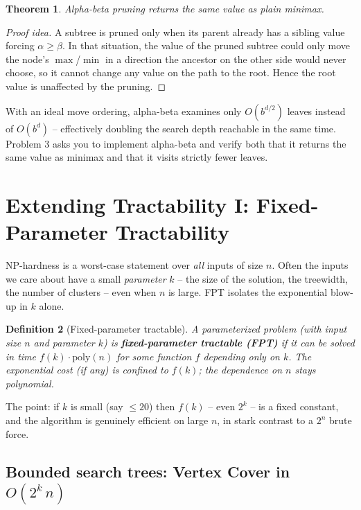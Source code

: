 \documentclass[11pt]{article}
\newtheorem{theorem}{Theorem}[section]
\newtheorem{definition}[theorem]{Definition}
\begin{document}
\begin{theorem}
Alpha-beta pruning returns the same value as plain minimax.
\end{theorem}

\begin{proof}[Proof idea]
A subtree is pruned only when its parent already has a sibling value forcing
$\alpha \ge \beta$. In that situation, the value of the pruned subtree could
only move the node's $\max$/$\min$ in a direction the ancestor on the other side
would never choose, so it cannot change any value on the path to the root.
Hence the root value is unaffected by the pruning.
\end{proof}

With an ideal move ordering, alpha-beta examines only $O(b^{d/2})$ leaves
instead of $O(b^d)$ -- effectively doubling the search depth reachable in the
same time. Problem 3 asks you to implement alpha-beta and verify both that it
returns the same value as minimax and that it visits strictly fewer leaves.

\section{Extending Tractability I: Fixed-Parameter Tractability}

NP-hardness is a worst-case statement over \emph{all} inputs of size $n$. Often
the inputs we care about have a small \emph{parameter} $k$ -- the size of the
solution, the treewidth, the number of clusters -- even when $n$ is large. FPT
isolates the exponential blow-up in $k$ alone.

\begin{definition}[Fixed-parameter tractable]
A parameterized problem (with input size $n$ and parameter $k$) is
\textbf{fixed-parameter tractable (FPT)} if it can be solved in time
$f(k)\cdot \mathrm{poly}(n)$ for some function $f$ depending only on $k$. The
exponential cost (if any) is confined to $f(k)$; the dependence on $n$ stays
polynomial.
\end{definition}

The point: if $k$ is small (say $\le 20$) then $f(k)$ -- even $2^k$ -- is a
fixed constant, and the algorithm is genuinely efficient on large $n$, in stark
contrast to a $2^n$ brute force.

\subsection{Bounded search trees: Vertex Cover in $O(2^k\, n)$}
\end{document}
